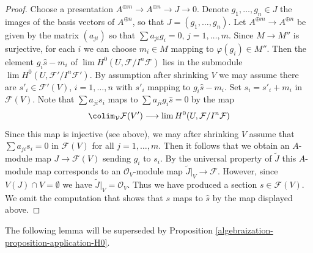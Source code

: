 \begin{proof}
\medskip\noindent
Choose a presentation $A^{\oplus m} \to A^{\oplus n} \to J \to 0$.
Denote $g_1, \ldots, g_n \in J$ the images of the basis vectors
of $A^{\oplus n}$, so that $J = (g_1, \ldots, g_n)$. Let
$A^{\oplus m} \to A^{\oplus n}$ be given by the matrix $(a_{ji})$
so that $\sum a_{ji} g_i = 0$, $j = 1, \ldots, m$.
Since $M \to M''$ is surjective, for each $i$ we can choose $m_i \in M$
mapping to $\varphi(g_i) \in M''$. Then the element $g_i \hat s - m_i$
of $\lim H^0(U, \mathcal{F}/I^n\mathcal{F})$ lies in
the submodule $\lim H^0(U, \mathcal{F}'/I^n\mathcal{F}')$.
By assumption after shrinking $V$ we may assume there are
$s'_i \in \mathcal{F}'(V)$, $i = 1, \ldots, n$
with $s'_i$ mapping to $g_i \hat s - m_i$.
Set $s_i = s'_i + m_i$ in $\mathcal{F}(V)$.
Note that $\sum a_{ji} s_i$ maps to $\sum a_{ji}g_i\hat s = 0$
by the map
$$
\colim_\mathcal{V} \mathcal{F}(V')
\longrightarrow
\lim H^0(U, \mathcal{F}/I^n\mathcal{F})
$$
Since this map is injective (see above), we may after shrinking $V$ assume
that $\sum a_{ji}s_i = 0$ in $\mathcal{F}(V)$ for all $j = 1, \ldots, m$.
Then it follows that we obtain an $A$-module map $J \to \mathcal{F}(V)$
sending $g_i$ to $s_i$. By the universal property of $\widetilde{J}$
this $A$-module map corresponds to an $\mathcal{O}_V$-module map
$\widetilde{J}|_V \to \mathcal{F}$. However, since $V(J) \cap V = \emptyset$
we have $\widetilde{J}|_V = \mathcal{O}_V$. Thus we have produced
a section $s \in \mathcal{F}(V)$. We omit the computation that
shows that $s$ maps to $\hat s$ by the map displayed above.
\end{proof}

The following lemma will be superseded by
Proposition \ref{algebraization-proposition-application-H0}.

